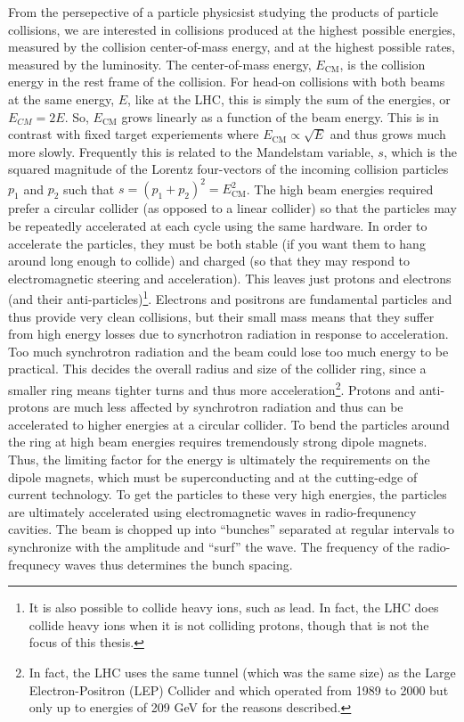 From the persepective
of a particle physicsist studying the products of particle collisions, we 
are interested in collisions produced at the highest possible energies,
measured by the collision center-of-mass energy, and at the highest possible rates, 
measured by the luminosity.
The center-of-mass energy, $E_{\textrm{CM}}$, is the collision energy 
in the rest frame
of the collision. For head-on collisions with both beams at the same
energy, $E$, like at the LHC, this is simply the sum of the energies, 
or $E_{CM} = 2 E$. So, $E_{\textrm{CM}}$ grows linearly as a function
of the beam energy. This is in contrast with fixed target experiements
where $E_{\textrm{CM}} \propto \sqrt{E}$ and thus grows much more slowly. 
Frequently this is related to the Mandelstam variable,
$s$, which is the squared magnitude of the Lorentz four-vectors
of the incoming collision particles $p_1$ and $p_2$ such that
$s = (p_1+p_2)^2 = E_\textrm{CM}^2$.
The high beam energies required prefer a circular collider (as opposed
to a linear collider) so that the particles may be repeatedly 
accelerated at each cycle using the same hardware.
In order to accelerate the particles, they must be both stable (if you
want them to hang around long enough to collide) and charged (so
that they may respond to electromagnetic steering and acceleration).
This leaves just protons and electrons (and their anti-particles)\footnote{It is also
possible to collide heavy ions, such as lead. In fact, the LHC does collide
heavy ions when it is not colliding protons, though that is not the focus of this
thesis.}.
Electrons and positrons are fundamental particles and thus provide
very clean collisions, but their small mass means that they suffer
from high energy losses due to syncrhotron radiation in response to acceleration. 
Too much synchrotron radiation and the beam could lose too much energy
to be practical. 
This decides the overall radius and size of the collider ring, since a smaller
ring means tighter turns and thus more acceleration\footnote{In fact, 
the LHC uses the same tunnel (which was the same size) as 
the Large Electron-Positron (LEP) Collider and which
operated from 1989 to 2000 but only up to energies of 209 GeV for the reasons
described.}.
Protons and anti-protons are much less affected by synchrotron radiation
and thus can be accelerated to higher energies at a circular collider.
To bend the particles around the ring at high beam energies 
requires tremendously strong dipole magnets. 
Thus, the limiting factor for the energy is ultimately the requirements
on the dipole magnets, which must be superconducting and at the cutting-edge 
of current technology.
To get the particles to these very high energies, the particles
are ultimately accelerated using electromagnetic waves in radio-frequnency cavities.
The beam is chopped up into ``bunches'' separated at regular intervals
to synchronize with the amplitude and ``surf'' the wave.  The frequency
of the radio-frequnecy waves thus determines the bunch spacing.


